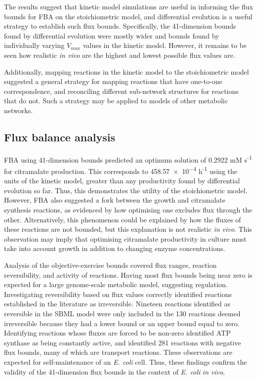 \documentclass[parskip=full, numbers=noenddot]{scrreprt}
\begin{document}

The results suggest that kinetic model simulations are useful in informing the flux bounds for FBA on the stoichiometric model, and differential evolution is a useful strategy to establish such flux bounds. Specifically, the 41-dimension bounds found by differential evolution were mostly wider and bounds found by individually varying $V_{max}$ values in the kinetic model. However, it remains to be seen how realistic \emph{in vivo} are the highest and lowest possible flux values are.

Additionally, mapping reactions in the kinetic model to the stoichiometric model suggested a general strategy for mapping reactions that have one-to-one correspondence, and reconciling different sub-network structures for reactions that do not. Such a strategy may be applied to models of other metabolic networks.

\subsection{Flux balance analysis}
\label{ssec:discussion-stoichiometric-fba}

FBA using 41-dimension bounds predicted an optimum solution of 0.2922 mM s\textsuperscript{-1} for citramalate production. This corresponds to \num{458.57e-4} h\textsuperscript{-1} using the units of the kinetic model, greater than any productivity found by differential evolution so far. Thus, this demonstrates the utility of the stoichiometric model. However, FBA also suggested a fork between the growth and citramalate synthesis reactions, as evidenced by how optimising one excludes flux through the other. Alternatively, this phenomenon could be explained by how the fluxes of these reactions are not bounded, but this explanation is not realistic \emph{in vivo}. This observation may imply that optimising citramalate productivity in culture must take into account growth in addition to changing enzyme concentrations.

Analysis of the objective-exercise bounds covered flux ranges, reaction reversibility, and activity of reactions.
Having most flux bounds being near zero is expected for a large genome-scale metabolic model, suggesting regulation.
Investigating reversibility based on flux values correctly identified reactions established in the literature as irreversible. Nineteen reactions identified as reversible in the SBML model were only included in the 130 reactions deemed irreversible because they had a lower bound or an upper bound equal to zero.
Identifying reactions whose fluxes are forced to be non-zero identified ATP synthase as being constantly active, and identified 281 reactions with negative flux bounds, many of which are transport reactions. These observations are expected for self-maintenance of an \emph{E. coli} cell.
Thus, these findings confirm the validity of the 41-dimension flux bounds in the context of \emph{E. coli} \emph{in vivo}.
\end{document}
